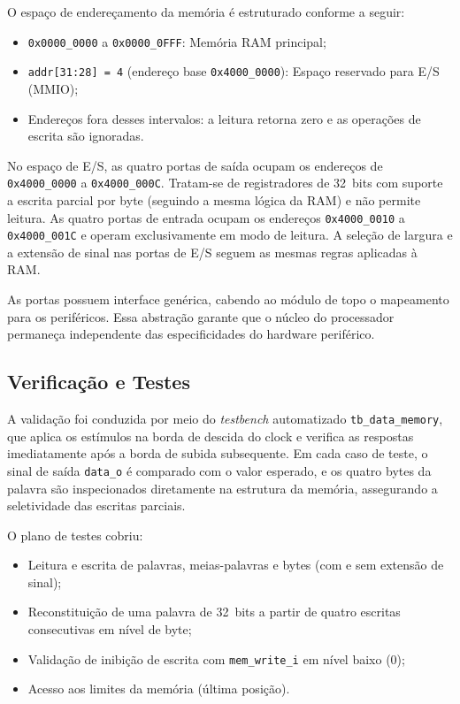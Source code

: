 O espaço de endereçamento da memória é estruturado conforme a seguir:
\begin{itemize}
    \item \texttt{0x0000\_0000} a \texttt{0x0000\_0FFF}: Memória RAM principal;
    \item \texttt{addr[31:28] = 4} (endereço base \texttt{0x4000\_0000}): Espaço reservado para E/S (MMIO);
    \item Endereços fora desses intervalos: a leitura retorna zero e as operações de escrita são ignoradas.
    
\end{itemize}

No espaço de E/S, as quatro portas de saída ocupam os endereços de \texttt{0x4000\_0000} a \texttt{0x4000\_000C}. Tratam-se de registradores de 32~bits com suporte a escrita parcial por byte (seguindo a mesma lógica da RAM) e não permite leitura. As quatro portas de entrada ocupam os endereços \texttt{0x4000\_0010} a \texttt{0x4000\_001C} e operam exclusivamente em modo de leitura. A seleção de largura e a extensão de sinal nas portas de E/S seguem as mesmas regras aplicadas à RAM. 

As portas possuem interface genérica, cabendo ao módulo de topo o mapeamento para os periféricos.
Essa abstração garante que o núcleo do processador permaneça independente das especificidades do hardware periférico.

\subsection{Verificação e Testes}
\label{sub:testebenchMemoriaDados}

A validação foi conduzida por meio do \textit{testbench} automatizado \texttt{tb\_data\_memory}, que aplica os estímulos na borda de descida do clock e verifica as respostas imediatamente após a borda de subida subsequente. Em cada caso de teste, o sinal de saída \texttt{data\_o} é comparado com o valor esperado, e os quatro bytes da palavra são inspecionados diretamente na estrutura da memória, assegurando a seletividade das escritas parciais.

O plano de testes cobriu:
\begin{itemize}
    \item Leitura e escrita de palavras, meias-palavras e bytes (com e sem extensão de sinal);
    \item Reconstituição de uma palavra de 32~bits a partir de quatro escritas consecutivas em nível de byte;
    \item Validação de inibição de escrita com \texttt{mem\_write\_i} em nível baixo (0);
    \item Acesso aos limites da memória (última posição).
\end{itemize}

